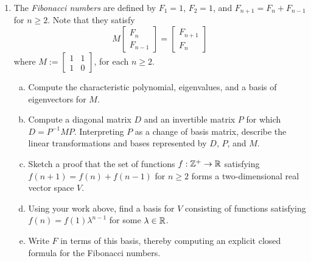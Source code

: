 \documentclass[12pt]{article}
\begin{document}
\begin{enumerate}
%
%
%
%
%
%
%

\item 
The {\itshape Fibonacci numbers} are defined by $F_1 = 1$, $F_2 = 1$, and $F_{n + 1} = F_n + F_{n - 1}$ for $n \geq 2$.
Note that they satisfy
\[
M
\begin{bmatrix}
F_n \\ F_{n - 1}  
\end{bmatrix}
=
\begin{bmatrix}
F_{n + 1} \\ F_{n}  
\end{bmatrix}
\]
where $M := \begin{bmatrix}
1 & 1 \\ 1 & 0 
\end{bmatrix}$, for each $n \geq 2$.
\begin{enumerate}[(a)]
\item Compute the characteristic polynomial, eigenvalues, and a basis of eigenvectors for $M$. 
\item Compute a diagonal matrix $D$ and an invertible matrix $P$ for which $D = P^{-1} M P$. Interpreting $P$ as a change 
of basis matrix, describe the linear transformations and bases represented by $D$, $P$, and $M$.
\item Sketch a proof that the set of functions $f : \mathbb{Z}^+ \rightarrow \mathbb{R}$ satisfying $f(n + 1) = f(n) + f(n - 1)$ for $n \geq 2$
forms a two-dimensional real vector space $V$. 
\item Using your work above, find a basis for $V$ consisting of functions satisfying $f(n) = f(1) \lambda^{n - 1}$ for some
$\lambda \in \mathbb{R}$. 
\item Write $F$ in terms of this basis, thereby computing an explicit closed formula for the Fibonacci numbers.
\end{enumerate}


\end{enumerate}
\end{document}
